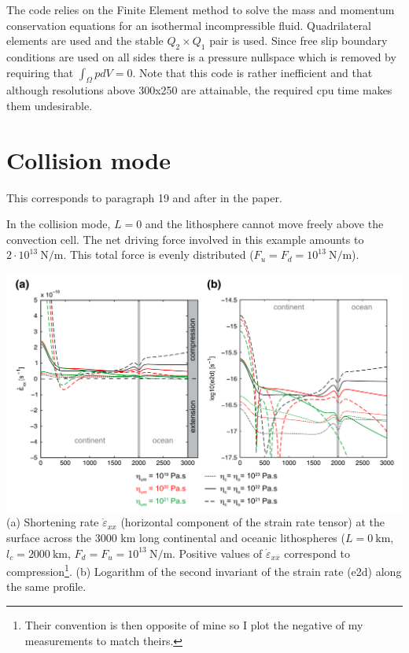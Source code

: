 The code relies on the Finite Element method to solve the mass and momentum conservation
equations for an isothermal incompressible fluid. 
Quadrilateral elements are used and the stable $Q_2\times Q_1$ pair is used.
Since free slip boundary conditions are used on all sides there is a pressure 
nullspace which is removed by requiring that $\int_\Omega p dV=0$.
Note that this code is rather inefficient and that although resolutions above 300x250 
are attainable, the required cpu time makes them undesirable. 

\newpage
\section*{Collision mode}

This corresponds to paragraph 19 and after in the paper. 

In the collision mode, $L = 0$ and the lithosphere cannot
move freely above the convection cell. The net driving force involved in this
example amounts to $2\cdot 10^{13}~\si{\newton\per\meter}$. This total force is evenly
distributed ($F_u = F_d = 10^{13}~\si{\newton\per\meter}$). 


\begin{center}
\includegraphics[width=14cm]{python_codes/fieldstone_143/images/fig4}\\
{\captionfont (a) Shortening rate  $\dot{\varepsilon}_{xx}$ 
(horizontal component of the strain rate tensor) at the surface across the
3000 km long continental and oceanic lithospheres ($L = 0~\si{\km}$, 
$l_c = 2000~\si{\km}$, $F_d = F_u = 10^{13}~\si{\newton\per\meter}$. 
Positive values of  $\dot{\varepsilon}_{xx}$ correspond to compression\footnote{Their convention
is then opposite of mine so I plot the negative of my measurements to match theirs.}. 
(b) Logarithm of the second invariant of the strain rate (e2d) along the same profile.}
\end{center}

